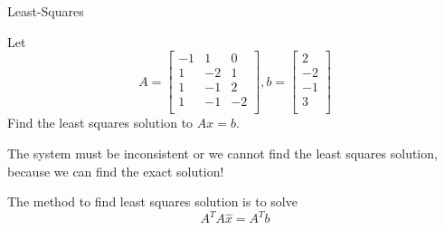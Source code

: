 \documentclass{beamer}
\begin{document}
\begin{frame}{Least-Squares}
\begin{example}
Let
\begin{equation*}
    A=\left[ \begin{matrix}
        -1&		1&		0\\
        1&		-2&		1\\
        1&		-1&		2\\
        1&		-1&		-2\\
    \end{matrix} \right] , b=\left[ \begin{array}{c}
        2\\
        -2\\
        -1\\
        3\\
    \end{array} \right]
\end{equation*}
Find the least squares solution to $Ax=b$.
\end{example}

The system must be inconsistent or we cannot find the least squares solution, because we can find the exact solution!

The method to find least squares solution is to solve
\begin{equation*}
    A^TA\hat{x}=A^Tb
\end{equation*}
\end{frame}
\end{document}
